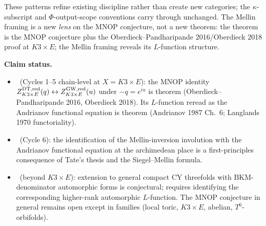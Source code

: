 These patterns refine existing discipline rather than create new
categories; the $\kappa$-subscript and $\Phi$-output-scope
conventions carry through unchanged. The Mellin framing is a
new \emph{lens} on the MNOP conjecture, not a new theorem: the
theorem is the MNOP conjecture plus the Oberdieck--Pandharipande
2016/Oberdieck 2018 proof at $K3\times E$; the Mellin framing
reveals its $L$-function structure.

\medskip
\noindent\textbf{Claim status.}\
\begin{itemize}[leftmargin=1.5em]
\item \ClaimStatusTheorem\ (Cycles 1--5 chain-level at
  $X=K3\times E$): the MNOP identity
  $Z^{\mathrm{DT},\mathrm{red}}_{K3\times E}(q)\leftrightarrow Z^{\mathrm{GW},\mathrm{red}}_{K3\times E}(u)$
  under $-q=e^{iu}$ is theorem (Oberdieck--Pandharipande
  2016, Oberdieck 2018). Its $L$-function reread as the Andrianov
  functional equation is theorem (Andrianov 1987 Ch.\ 6;
  Langlands 1970 functoriality).
\item \ClaimStatusDerivation\ (Cycle 6): the identification of the
  Mellin-inversion involution with the Andrianov functional
  equation at the archimedean place is a first-principles
  consequence of Tate's thesis and the Siegel--Mellin formula.
\item \ClaimStatusConjectured\ (beyond $K3\times E$): extension to
  general compact CY threefolds with BKM-denominator automorphic
  forms is conjectural; requires identifying the corresponding
  higher-rank automorphic $L$-function. The MNOP conjecture in
  general remains open except in families (local toric, $K3\times E$,
  abelian, $T^6$-orbifolds).
\end{itemize}

